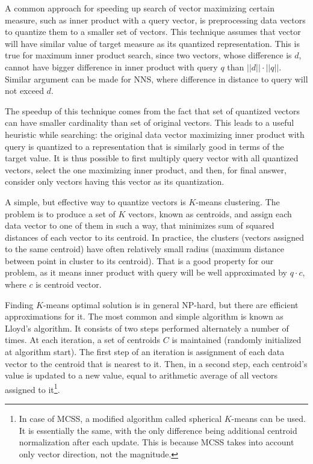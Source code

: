 A common approach for speeding up search of vector maximizing certain measure,
such as inner product with a query vector, is preprocessing data vectors to
quantize them to a smaller set of vectors. This technique assumes that vector
will have similar value of target measure as its quantized representation.
This is true for maximum inner product search, since two vectors,
whose difference is $d$, cannot have bigger difference in inner product with
query $q$ than $||d|| \cdot ||q||$. Similar argument can be made for NNS,
where difference in distance to query will not exceed $d$.

The speedup of this technique comes from the fact that set of quantized vectors
can have smaller cardinality than set of original vectors. This leads to a 
useful heuristic while searching: the original data vector maximizing 
inner product with query is quantized to a representation that is similarly
good in terms of the target value. It is thus possible to first multiply 
query vector with all quantized vectors, select the one maximizing inner
product, and then, for final answer, consider only vectors having this vector
as its quantization.

A simple, but effective way to quantize vectors is $K$-means clustering.
The problem is to produce a set of $K$ vectors, known as centroids, and assign
each data vector to one of them in such a way, that minimizes sum of squared
distances of each vector to its centroid. In practice, the clusters (vectors
assigned to the same centroid) have often relatively small radius (maximum
distance between point in cluster to its centroid). That is a good property 
for our problem, as it means inner product with query will be well approximated
by $q \cdot c$, where $c$ is centroid vector.

Finding $K$-means optimal solution is in general NP-hard, but there are efficient
approximations for it. The most common and simple algorithm is known as 
Lloyd's algorithm. It consists of two steps performed alternately a number of
times. At each iteration, a set of centroids $C$ is maintained (randomly
initialized at algorithm start). The first
step of an iteration is assignment of each data vector to the centroid that
is nearest to it. Then, in a second step, each centroid's value is updated
to a new value, equal to arithmetic average of all vectors assigned to
it\footnote{
In case of MCSS, a modified algorithm called spherical $K$-means can be used.
It is essentially the same, with the only difference being additional
centroid normalization after each update. This is because MCSS
takes into account only vector direction, not the magnitude.
}.

